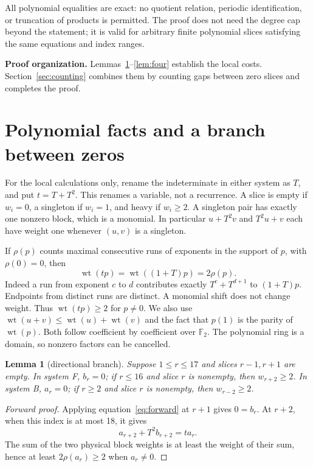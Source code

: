 \documentclass{article}
\newtheorem{lemma}{Lemma}
\DeclareMathOperator{\wt}{wt}
\begin{document}
All polynomial equalities are exact: no quotient relation, periodic identification, or truncation
of products is permitted. The proof does not need the degree cap beyond the statement; it is valid
for arbitrary finite polynomial slices satisfying the same equations and index ranges.

\textbf{Proof organization.} Lemmas~\ref{lem:branch}--\ref{lem:four} establish the local costs.
Section~\ref{sec:counting} combines them by counting gaps between zero slices and completes the
proof.

\section{Polynomial facts and a branch between zeros}\label{sec:polynomial}

For the local calculations only, rename the indeterminate in either system as \(T\), and put
\(t = T + T^2\). This renames a variable, not a recurrence. A slice is empty if \(w_i = 0\), a
singleton if \(w_i = 1\), and heavy if \(w_i \ge 2\). A singleton pair has exactly one nonzero
block, which is a monomial. In particular \(u + T^2 v\) and \(T^2 u + v\) each have weight one
whenever \((u,v)\) is a singleton.

If \(\rho(p)\) counts maximal consecutive runs of exponents in the support of \(p\), with
\(\rho(0) = 0\), then
\begin{equation}\label{eq:runs}
  \wt(tp) = \wt((1 + T)p) = 2\rho(p).
\end{equation}
Indeed a run from exponent \(c\) to \(d\) contributes exactly \(T^c + T^{d+1}\) to \((1 + T)p\).
Endpoints from distinct runs are distinct. A monomial shift does not change weight. Thus
\(\wt(tp) \ge 2\) for \(p \ne 0\). We also use \(\wt(u + v) \le \wt(u) + \wt(v)\) and the fact
that \(p(1)\) is the parity of \(\wt(p)\). Both follow coefficient by coefficient over
\(\mathbb{F}_2\). The polynomial ring is a domain, so nonzero factors can be cancelled.

\begin{lemma}[directional branch]\label{lem:branch}
  Suppose \(1 \le r \le 17\) and slices \(r - 1, r + 1\) are empty. In system F, \(b_r = 0\); if
  \(r \le 16\) and slice \(r\) is nonempty, then \(w_{r+2} \ge 2\). In system B, \(a_r = 0\); if
  \(r \ge 2\) and slice \(r\) is nonempty, then \(w_{r-2} \ge 2\).
\end{lemma}

\begin{proof}[Forward proof]
  Applying equation~\eqref{eq:forward} at \(r + 1\) gives \(0 = b_r\). At \(r + 2\), when this
  index is at most 18, it gives
  \begin{equation}
    a_{r+2} + T^2 b_{r+2} = t a_r.
  \end{equation}
  The sum of the two physical block weights is at least the weight of their sum, hence at least
  \(2\rho(a_r) \ge 2\) when \(a_r \ne 0\).
\end{proof}
\end{document}
